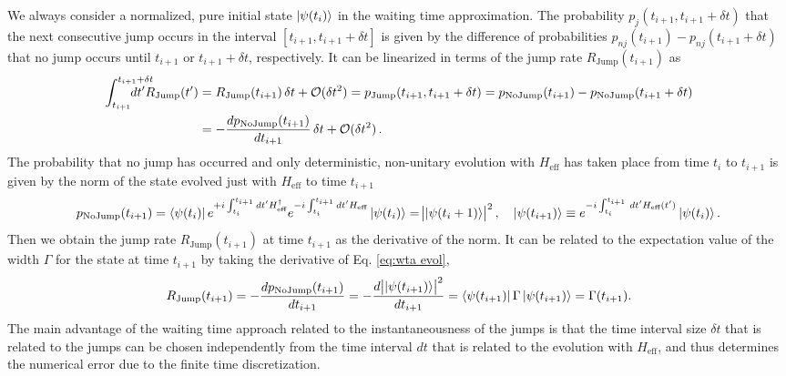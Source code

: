 \documentclass[times,sort&compress,final]{elsarticle}
\begin{document}
We always consider a normalized, pure initial state $\ket{\psi(t_i)}$ in the 
waiting time approximation. 
The probability $p_j(t_{i+1},t_{i+1}+\delta t)$ that the next consecutive jump 
occurs in the interval $[t_{i+1},t_{i+1}+\delta t]$ is given by the difference 
of probabilities $p_{nj}(t_{i+1})-p_{nj}(t_{i+1}+\delta t)$ that 
no jump occurs until $t_{i+1}$ or $t_{i+1}+\delta t$, respectively. 
It can be linearized in terms of the jump rate 
$R_\text{Jump}(t_{i+1})$ as 
\begin{align}
\int_{t_{i+1}}^{t_{i+1}+\delta t} \hskip-2em dt^\prime  R_\text{Jump}(t^\prime)
&=R_\text{Jump}(t_{i+1})\, \delta t + \mathcal{O}(\delta t^2)
= p_\text{Jump}(t_{i+1},t_{i+1}+\delta t) 
=  p_\text{NoJump}(t_{i+1}) -p_\text{NoJump}(t_{i+1}+\delta t) 
\nonumber\\
&= -\frac{d p_\text{NoJump}(t_{i+1})}{d t_{i+1}}\, \delta t + \mathcal{O}(\delta t^2)\,.
\end{align}
The probability that no jump has occurred and only deterministic, non-unitary evolution with $H_\text{eff}$ 
has taken place from time $t_{i}$ to $t_{i+1}$ is given by the norm of the state evolved just with 
$H_\text{eff}$ to time $t_{i+1}$ 
\begin{equation}
p_\text{NoJump}(t_{i+1}) 
= \bra{\psi(t_i)} e^{+i\int_{t_{i}}^{t_{i+1}}dt^\prime H_\text{eff}^\dagger} 
e^{-i\int_{t_{i}}^{t_{i+1}} dt^\prime H_\text{eff}}\ket{\psi(t_i)}
= \abs{\ket{\psi(t_i+1)}}^2, 
\quad 
\ket{\psi(t_{i+1}) } \equiv e^{-i\int_{t_i}^{t_{i+1}}\,dt'H_\text{eff}(t')} \ket{ \psi(t_i)}. 
\label{eq:wta evol}
\end{equation}
Then we obtain the jump rate $R_\text{Jump}(t_{i+1})$ at time $t_{i+1}$ as the derivative of the norm. 
It can be related to the expectation value of the width $\Gamma$ for the state at time $t_{i+1}$ by 
taking the derivative of Eq. \eqref{eq:wta evol},
\begin{align}
R_\text{Jump}(t_{i+1}) 
= - \frac{d p_\text{NoJump}(t_{i+1}) }{d t_{i+1}}
= -\frac{d \abs{ \ket{ \psi(t_{i+1})} }^2 }{d t_{i+1}}
= \bra{\psi(t_{i+1})} \Gamma \ket{ \psi(t_{i+1})}
= \Gamma(t_{i+1}).
\label{eq:wta}
\end{align}
The main advantage of the waiting time approach related to the instantaneousness of the jumps is that the time 
interval size $\delta t$ that is related to the jumps can be chosen independently from the time interval $dt$ that 
is related to the evolution with $H_\text{eff}$, and thus determines the numerical error due to the finite time discretization.  
\end{document}
